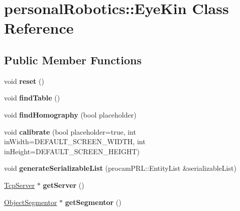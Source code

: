 \hypertarget{classpersonal_robotics_1_1_eye_kin}{}\section{personal\+Robotics\+:\+:Eye\+Kin Class Reference}
\label{classpersonal_robotics_1_1_eye_kin}
\subsection*{Public Member Functions}
\begin{DoxyCompactItemize}
\item 
\hypertarget{classpersonal_robotics_1_1_eye_kin_ae73f964eff8b9b589eb98e114837d0e8}{}void {\bfseries reset} ()\label{classpersonal_robotics_1_1_eye_kin_ae73f964eff8b9b589eb98e114837d0e8}

\item 
\hypertarget{classpersonal_robotics_1_1_eye_kin_a2d45936cb7b2286c2d85f19259d44a79}{}void {\bfseries find\+Table} ()\label{classpersonal_robotics_1_1_eye_kin_a2d45936cb7b2286c2d85f19259d44a79}

\item 
\hypertarget{classpersonal_robotics_1_1_eye_kin_a3e225c90169e0a32938a25d673d2824e}{}void {\bfseries find\+Homography} (bool placeholder)\label{classpersonal_robotics_1_1_eye_kin_a3e225c90169e0a32938a25d673d2824e}

\item 
\hypertarget{classpersonal_robotics_1_1_eye_kin_abb215dc174bbf71fc0a473137e75414d}{}void {\bfseries calibrate} (bool placeholder=true, int in\+Width=D\+E\+F\+A\+U\+L\+T\+\_\+\+S\+C\+R\+E\+E\+N\+\_\+\+W\+I\+D\+T\+H, int in\+Height=D\+E\+F\+A\+U\+L\+T\+\_\+\+S\+C\+R\+E\+E\+N\+\_\+\+H\+E\+I\+G\+H\+T)\label{classpersonal_robotics_1_1_eye_kin_abb215dc174bbf71fc0a473137e75414d}

\item 
\hypertarget{classpersonal_robotics_1_1_eye_kin_a8de20b9f3bfc167e49ed3e134a8d9372}{}void {\bfseries generate\+Serializable\+List} (procam\+P\+R\+L\+::\+Entity\+List \&serializable\+List)\label{classpersonal_robotics_1_1_eye_kin_a8de20b9f3bfc167e49ed3e134a8d9372}

\item 
\hypertarget{classpersonal_robotics_1_1_eye_kin_ab1bfd02a55adaba65d91b776f594d3c3}{}\hyperlink{classpersonal_robotics_1_1_tcp_server}{Tcp\+Server} $\ast$ {\bfseries get\+Server} ()\label{classpersonal_robotics_1_1_eye_kin_ab1bfd02a55adaba65d91b776f594d3c3}

\item 
\hypertarget{classpersonal_robotics_1_1_eye_kin_a4579c0cb661be45631e1769f3008a6cb}{}\hyperlink{classpersonal_robotics_1_1_object_segmentor}{Object\+Segmentor} $\ast$ {\bfseries get\+Segmentor} ()\label{classpersonal_robotics_1_1_eye_kin_a4579c0cb661be45631e1769f3008a6cb}

\end{DoxyCompactItemize}
